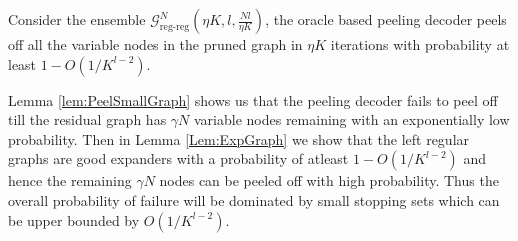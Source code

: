 \documentclass[conference]{IEEEtran}
\begin{document}
\begin{theorem}\label{Thm:PeelingOptimal}
Consider the ensemble $\mathcal{G}^{N}_{\text{reg-reg}}(\eta K,l,\frac{Nl}{\eta K})$, the oracle based peeling decoder peels off all the variable nodes in the pruned graph in $\eta K$ iterations with probability at least $1-O\left(1/K^{l-2}\right)$.
\end{theorem}
\begin{IEEEproof}
 Lemma \ref{lem:PeelSmallGraph} shows us that the peeling decoder fails to peel off till the residual graph has $\gamma N$ variable nodes remaining with an exponentially low probability. Then in Lemma \ref{Lem:ExpGraph} we show that the left regular graphs are good expanders with a probability of atleast $1-O(1/K^{l-2})$ and hence the remaining $\gamma N$ nodes can be peeled off with high probability. Thus the overall probability of failure will be dominated by small stopping sets which can be upper bounded by $O(1/K^{l-2})$.
\end{IEEEproof}
\vspace{3ex}
\end{document}
